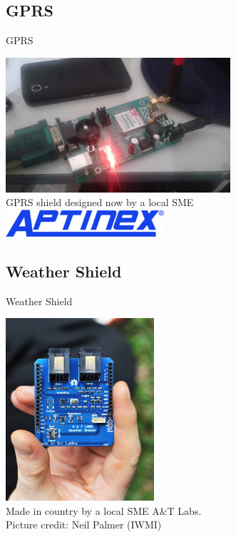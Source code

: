 \documentclass[xcolor=dvipsnames,beamer,unknownkeysallowed]{beamer} %
\begin{document}
\subsection{GPRS}
\begin{frame}[fragile]{GPRS}

\begin{center}
 \includegraphics[height=5cm]{aptinex_GPRS_0}\\
 GPRS shield designed now by a local SME\\
 \vspace{2mm}
 \includegraphics[height=1cm]{aptinex}
\end{center}

\end{frame}

\subsection{Weather Shield}
\begin{frame}[fragile]{Weather Shield}

\begin{center}
 \includegraphics[width=5.5cm]{WeatherShield}\\
\vspace{5mm}
Made in country by a local SME A\&T Labs.\\
Picture credit: Neil Palmer (IWMI)
\end{center}

\end{frame}
\end{document}
